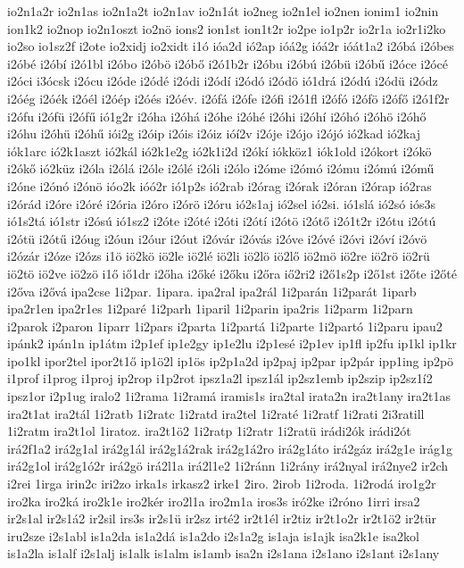 {io2n1a2r
io2n1as
io2n1a2t
io2n1av
io2n1át
io2neg
io2n1el
io2nen
ionim1
io2nin
ion1k2
io2nop
io2n1oszt
io2nö
ions2
ion1st
ion1t2r
io2pe
io1p2r
io2r1a
io2r1i2ko
io2so
io1sz2f
i2ote
io2xidj
io2xidt
i1ó
ióa2d
ió2ap
ióá2g
ióá2r
ióát1a2
i2óbá
i2óbes
i2óbé
i2óbí
i2ó1bl
i2óbo
i2óbö
i2óbő
i2ó1b2r
i2óbu
i2óbú
i2óbü
i2óbű
i2óce
i2ócé
i2óci
i3ócsk
i2ócu
i2óde
i2ódé
i2ódi
i2ódí
i2ódó
i2ódö
ió1drá
i2ódú
i2ódü
i2ódz
i2óég
i2óék
i2óél
i2óép
i2óés
i2óév.
i2ófá
i2ófe
i2ófi
i2ó1fl
i2ófó
i2ófö
i2ófő
i2ó1f2r
i2ófu
i2ófü
i2ófű
ió1g2r
i2óha
i2óhá
i2óhe
i2óhé
i2óhi
i2óhí
i2óhó
i2óhö
i2óhő
i2óhu
i2óhü
i2óhű
iói2g
i2óip
i2óis
i2óiz
ióí2v
i2óje
i2ójo
i2ójó
ió2kad
ió2kaj
iók1arc
ió2k1aszt
ió2kál
ió2k1e2g
ió2k1i2d
i2ókí
iókköz1
iók1old
i2ókort
i2ókö
i2ókő
ió2küz
i2óla
i2ólá
i2óle
i2ólé
i2óli
i2ólo
i2óme
i2ómó
i2ómu
i2ómú
i2ómű
i2óne
i2ónó
i2ónö
ióo2k
ióó2r
ió1p2s
ió2rab
i2órag
i2órak
i2óran
i2órap
ió2ras
i2órád
i2óre
i2óré
i2ória
i2óro
i2órö
i2óru
ió2s1aj
ió2sel
ió2si.
ió1slá
ió2só
iós3s
ió1s2tá
ió1str
i2ósú
ió1sz2
i2óte
i2óté
i2óti
i2ótí
i2ótö
i2ótő
i2ó1t2r
i2ótu
i2ótú
i2ótü
i2ótű
i2óug
i2óun
i2óur
i2óut
i2óvár
i2óvás
i2óve
i2óvé
i2óvi
i2óví
i2óvö
i2ózár
i2óze
i2ózs
i1ö
iö2kö
iö2le
iö2lé
iö2li
iö2lö
iö2lő
iö2mö
iö2re
iö2rö
iö2rü
iö2tö
iö2ve
iö2zö
i1ő
iő1dr
i2őha
i2őké
i2őku
i2őra
iő2ri2
i2ő1s2p
i2ő1st
i2őte
i2őté
i2őva
i2ővá
ipa2cse
1i2par.
1ipara.
ipa2ral
ipa2rál
1i2parán
1i2parát
1iparb
ipa2r1en
ipa2r1es
1i2paré
1i2parh
1iparil
1i2parin
ipa2ris
1i2parm
1i2parn
i2parok
i2paron
1iparr
1i2pars
i2parta
1i2partá
1i2parte
1i2partó
1i2paru
ipau2
ipánk2
ipán1n
ip1átm
i2p1ef
ip1e2gy
ip1e2lu
i2p1esé
i2p1ev
ip1fl
ip2fu
ip1kl
ip1kr
ipo1kl
ipor2tel
ipor2t1ő
ip1ö2l
ip1ös
ip2p1a2d
ip2paj
ip2par
ip2pár
ipp1ing
ip2pö
i1prof
i1prog
i1proj
ip2rop
i1p2rot
ipsz1a2l
ipsz1ál
ip2sz1emb
ip2szip
ip2sz1í2
ipsz1or
i2p1ug
iralo2
1i2rama
1i2ramá
iramis1s
ira2tal
irata2n
ira2t1any
ira2t1as
ira2t1at
ira2tál
1i2ratb
1i2ratc
1i2ratd
ira2tel
1i2raté
1i2ratf
1i2rati
2i3ratill
1i2ratm
ira2t1ol
1iratoz.
ira2t1ö2
1i2ratp
1i2ratr
1i2ratü
irádi2ók
irádi2ót
irá2f1a2
irá2g1al
irá2g1ál
irá2g1á2rak
irá2g1á2ro
irá2g1áto
irá2gáz
irá2g1e
irág1g
irá2g1ol
irá2g1ó2r
irá2gö
irá2l1a
irá2l1e2
1i2ránn
1i2rány
irá2nyal
irá2nye2
ir2ch
i2rei
1irga
irin2c
iri2zo
irka1s
irkasz2
irke1
2iro.
2irob
1i2roda.
1i2rodá
iro1g2r
iro2ka
iro2ká
iro2k1e
iro2kér
iro2l1a
iro2m1a
iros3s
iró2ke
i2róno
1irri
irsa2
ir2s1al
ir2s1á2
ir2sil
irs3s
ir2s1ü
ir2sz
irté2
ir2t1él
ir2tiz
ir2t1o2r
ir2t1ö2
ir2tür
iru2sze
i2s1abl
is1a2da
is1a2dá
is1a2do
i2s1a2g
is1aja
is1ajk
isa2k1e
isa2kol
is1a2la
is1alf
i2s1alj
is1alk
is1alm
is1amb
isa2n
i2s1ana
i2s1ano
i2s1ant
i2s1any
}
